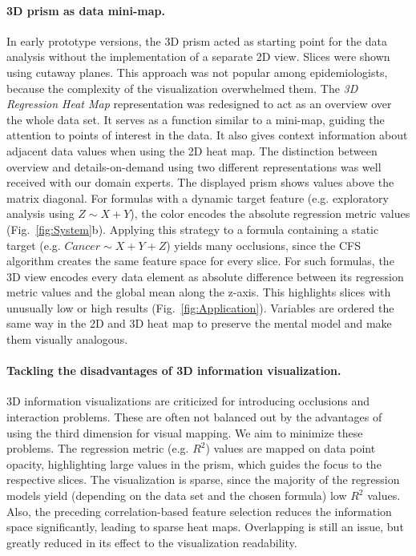 \documentclass[journal]{style/vgtc} 			          %
\begin{document}
\paragraph{3D prism as data mini-map.}
In early prototype versions, the 3D prism acted as starting point for the data analysis without the implementation of a separate 2D view.
Slices were shown using cutaway planes.
This approach was not popular among epidemiologists, because the complexity of the visualization overwhelmed them. %
The \emph{3D Regression Heat Map} representation was redesigned to act as an overview over the whole data set.
It serves as a function similar to a mini-map, guiding the attention to points of interest in the data.
It also gives context information about adjacent data values when using the 2D heat map.
The distinction between overview and details-on-demand using two different representations was well received with our domain experts.
The displayed prism shows values above the matrix diagonal.
For formulas with a dynamic target feature (e.g. exploratory analysis using $Z \sim X + Y$), the color encodes the absolute regression metric values (Fig.~\ref{fig:System}b).
Applying this strategy to a formula containing a static target (e.g. $Cancer \sim X + Y + Z$) yields many occlusions, since the CFS algorithm creates the same feature space for every slice.
For such formulas, the 3D view encodes every data element as absolute difference between its regression metric values and the global mean along the z-axis.
This highlights slices with unusually low or high results (Fig.~\ref{fig:Application}).
Variables are ordered the same way in the 2D and 3D heat map to preserve the mental model and make them visually analogous.

\paragraph{Tackling the disadvantages of 3D information visualization.}
3D information visualizations are criticized for introducing occlusions and interaction problems.
These are often not balanced out by the advantages of using the third dimension for visual mapping.
We aim to minimize these problems.
The regression metric (e.g. $R^2$) values are mapped on data point opacity, highlighting large values in the prism, which guides the focus to the respective slices.
The visualization is sparse, since the majority of the regression models yield (depending on the data set and the chosen formula) low $R^2$ values.
Also, the preceding correlation-based feature selection reduces the information space significantly, leading to sparse heat maps.
Overlapping is still an issue, but greatly reduced in its effect to the visualization readability.
\end{document}
